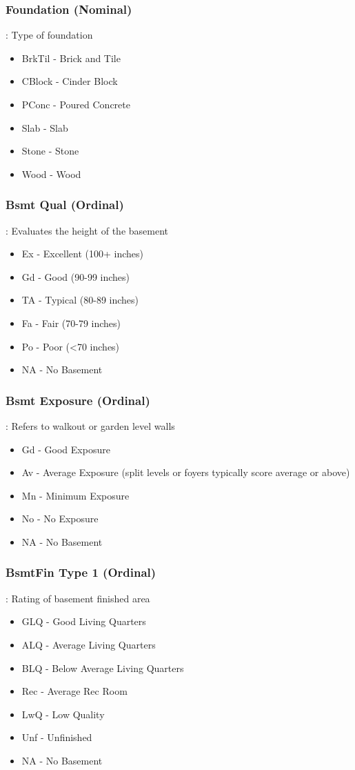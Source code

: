 \documentclass[sigconf]{acmart}
\begin{document}
	\subsubsection{Foundation (Nominal)}: Type of foundation
	\begin{itemize}
		\item  BrkTil - Brick and Tile
		\item  CBlock - Cinder Block
		\item  PConc - Poured Concrete
		\item  Slab - Slab
		\item  Stone - Stone
		\item  Wood - Wood
	\end{itemize}
	
	\subsubsection{Bsmt Qual (Ordinal)}: Evaluates the height of the basement
	\begin{itemize}
		\item  Ex - Excellent (100+ inches)
		\item  Gd - Good (90-99 inches)
		\item  TA - Typical (80-89 inches)
		\item  Fa - Fair (70-79 inches)
		\item  Po - Poor (<70 inches)
		\item  NA - No Basement
	\end{itemize}
	
	\subsubsection{Bsmt Exposure (Ordinal)}: Refers to walkout or garden level walls
	\begin{itemize}
		\item  Gd - Good Exposure
		\item  Av - Average Exposure (split levels or foyers typically score average or above)
		\item  Mn - Minimum Exposure
		\item  No - No Exposure
		\item  NA - No Basement
	\end{itemize}
	
	\subsubsection{BsmtFin Type 1 (Ordinal)}: Rating of basement finished area
	\begin{itemize}
		\item  GLQ - Good Living Quarters
		\item  ALQ - Average Living Quarters
		\item  BLQ - Below Average Living Quarters
		\item  Rec - Average Rec Room
		\item  LwQ - Low Quality
		\item  Unf - Unfinished
		\item  NA - No Basement
	\end{itemize}
	
\end{document}
